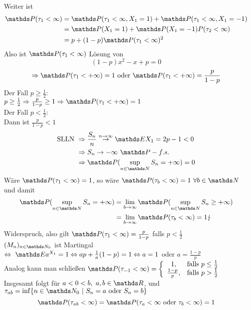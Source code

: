 \begin{enumerate}
	Weiter ist 
	\begin{equation*}
	\begin{aligned}	
		\Pw(\tau_1<\infty) &= \Pw(\tau_1<\infty,X_1=1)+\Pw(\tau_1<\infty,X_1=-1)\\
		&= \Pw(X_1=1)+\Pw(X_1=-1)P(\tau_2<\infty)\\
		&=p+(1-p)\Pw(\tau_1<\infty)^2
	\end{aligned}
	\end{equation*}
	Also ist $\Pw(\tau_1<\infty)$ Lösung von \[
	(1-p)x^2-x+p=0 
	\]
	\[
	\Rightarrow \Pw(\tau_1<+\infty)=1\text{ oder }\Pw(\tau_1<+\infty)=\frac{p}{1-p}
	\]
	Der Fall $p\ge \frac{1}{2}$:\\
	$p\ge \frac{1}{2}\Rightarrow\frac{p}{1-p}\ge 1 \Rightarrow\Pw(\tau_1<+\infty)=1$\\
	
	Der Fall $p<\frac{1}{2}$:\\
	Dann ist $\frac{p}{1-p}<1$\\
	\begin{equation*}
	\begin{aligned}
	\text{SLLN } &\Rightarrow \frac{S_n}{n}\stackrel{n\to\infty}{\to}\E X_1=2p-1<0\\
	&\Rightarrow S_n\to -\infty~\Pw-f.s.\\
	&\Rightarrow \Pw(\sup\limits_{n\in \N} S_n=+\infty)=0
	\end{aligned}
	\end{equation*}
	Wäre $\Pw(\tau_1<\infty)=1$, so wäre $\Pw(\tau_b<\infty)=1~\forall b\in \N$ und damit
	\begin{equation*}
	\begin{aligned}
		\Pw(\sup\limits_{n\in \N}S_n=+\infty) &= \lim\limits_{b\to\infty}\Pw(\sup\limits_{n\in \N}S_n\ge +\infty)\\
		&= \lim\limits_{b\to\infty}\Pw(\tau_b<\infty)=1 \lightning
	\end{aligned}
	\end{equation*}
	Widerspruch, also gilt $\Pw(\tau_1<\infty)=\frac{p}{1-p}$ falls $p<\frac{1}{2}$\\
	$(M_n)_{n\in \N_0}$ ist Martingal $\Leftrightarrow~ \E a^{X_1}=1\Leftrightarrow ap+\frac{1}{a}(1-p)=1\Leftrightarrow a=1$ oder $a=\frac{1-p}{p}$\\
	Analog kann man schließen $\Pw(\tau_{-1}<\infty)=\left\{\begin{array}{cl}  1, &\text{falls } p\le \frac{1}{2} \\ \frac{1-p}{p}, & \text{falls }p>\frac{1}{2}  \end{array}\right.$\\
	Insgesamt folgt für $a<0<b,~a,b\in \R$, und $\tau_{ab}=\inf\{n\in \N_0~|~S_n=a\text{ oder }S_n=b\}$
	\[
	\Pw(\tau_{ab}<\infty)=\Pw(\tau_a<\infty\text{ oder }\tau_b<\infty)=1
	\]
	

\end{enumerate}
